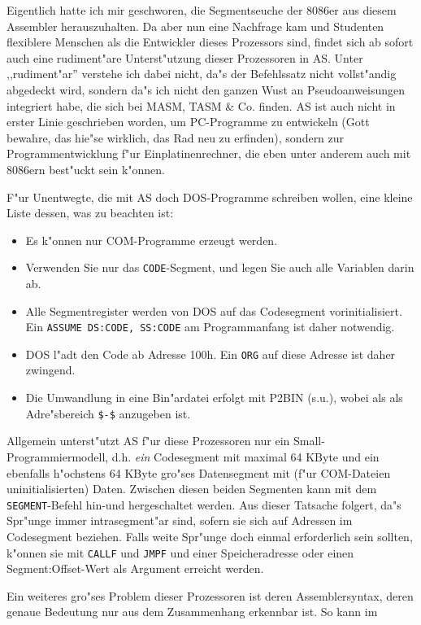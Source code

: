 \documentclass[12pt,a4paper,twoside]{report}
\newcommand{\ii}[1]{{\it #1}}
\newcommand{\tty}[1]{{\tt #1}}
\begin{document}
Eigentlich hatte ich mir geschworen, die Segmentseuche der 8086er aus diesem
Assembler herauszuhalten.  Da aber nun eine Nachfrage kam und Studenten
flexiblere Menschen als die Entwickler dieses Prozessors sind, findet sich
ab sofort auch eine rudiment"are Unterst"utzung dieser Prozessoren in AS.
Unter ,,rudiment"ar'' verstehe ich dabei nicht, da"s der Befehlssatz nicht
vollst"andig abgedeckt wird, sondern da"s ich nicht den ganzen Wust an
Pseudoanweisungen integriert habe, die sich bei MASM, TASM \& Co. finden.
AS ist auch nicht in erster Linie geschrieben worden, um PC-Programme zu
entwickeln (Gott bewahre, das hie"se wirklich, das Rad neu zu erfinden),
sondern zur Programmentwicklung f"ur Einplatinenrechner, die eben unter
anderem auch mit 8086ern best"uckt sein k"onnen.
\par
F"ur Unentwegte, die mit AS doch DOS-Programme schreiben wollen, eine kleine
Liste dessen, was zu beachten ist:
\begin{itemize}
\item{Es k"onnen nur COM-Programme erzeugt werden.}
\item{Verwenden Sie nur das \tty{CODE}-Segment, und legen Sie auch alle
      Variablen darin ab.}
\item{Alle Segmentregister werden von DOS auf das Codesegment
      vorinitialisiert.  Ein \tty{ASSUME DS:CODE, SS:CODE} am
      Programmanfang ist daher notwendig.}
\item{DOS l"adt den Code ab Adresse 100h.  Ein \tty{ORG} auf diese
      Adresse ist daher zwingend.}
\item{Die Umwandlung in eine Bin"ardatei erfolgt mit P2BIN (s.u.), wobei als
      als Adre"sbereich \tty{\$-\$} anzugeben ist.}
\end{itemize}
Allgemein unterst"utzt AS f"ur diese Prozessoren nur ein Small-Programmiermodell, d.h.
\ii{ein} Codesegment mit maximal 64 KByte und ein ebenfalls h"ochstens 64
KByte gro"ses Datensegment mit (f"ur COM-Dateien uninitialisierten) Daten.
Zwischen diesen beiden Segmenten kann mit dem \tty{SEGMENT}-Befehl hin-und hergeschaltet werden.
Aus dieser Tatsache folgert, da"s Spr"unge immer intrasegment"ar sind,
sofern sie sich auf Adressen im Codesegment beziehen.  Falls weite Spr"unge
doch einmal erforderlich sein sollten, k"onnen sie mit \tty{CALLF} und
\tty{JMPF} und einer Speicheradresse oder einen Segment:Offset-Wert als
Argument erreicht werden.
\par
Ein weiteres gro"ses Problem dieser Prozessoren ist deren Assemblersyntax,
deren genaue Bedeutung nur aus dem Zusammenhang erkennbar ist.  So kann im
\end{document}
